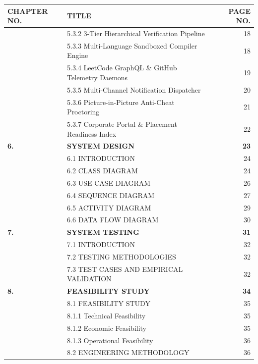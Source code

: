 \begin{table}[H]
  \centering
  \fontsize{12.5pt}{17.5pt}\selectfont
  \begin{tabularx}{\textwidth}{@{}p{3.2cm} L r@{}}
    \textbf{CHAPTER NO.} & \textbf{TITLE} & \textbf{PAGE NO.} \\
    \midrule
     & 5.3.2 3-Tier Hierarchical Verification Pipeline & 18 \\
     & 5.3.3 Multi-Language Sandboxed Compiler Engine & 18 \\
     & 5.3.4 LeetCode GraphQL \& GitHub Telemetry Daemons & 19 \\
     & 5.3.5 Multi-Channel Notification Dispatcher & 20 \\
     & 5.3.6 Picture-in-Picture Anti-Cheat Proctoring & 21 \\
     & 5.3.7 Corporate Portal \& Placement Readiness Index & 22 \\
    \textbf{6.} & \textbf{SYSTEM DESIGN} & \textbf{23} \\
     & 6.1 INTRODUCTION & 24 \\
     & 6.2 CLASS DIAGRAM & 24 \\
     & 6.3 USE CASE DIAGRAM & 26 \\
     & 6.4 SEQUENCE DIAGRAM & 27 \\
     & 6.5 ACTIVITY DIAGRAM & 29 \\
     & 6.6 DATA FLOW DIAGRAM & 30 \\
    \textbf{7.} & \textbf{SYSTEM TESTING} & \textbf{31} \\
     & 7.1 INTRODUCTION & 32 \\
     & 7.2 TESTING METHODOLOGIES & 32 \\
     & 7.3 TEST CASES AND EMPIRICAL VALIDATION & 32 \\
    \textbf{8.} & \textbf{FEASIBILITY STUDY} & \textbf{34} \\
     & 8.1 FEASIBILITY STUDY & 35 \\
     & 8.1.1 Technical Feasibility & 35 \\
     & 8.1.2 Economic Feasibility & 35 \\
     & 8.1.3 Operational Feasibility & 36 \\
     & 8.2 ENGINEERING METHODOLOGY & 36 \\
    \bottomrule
  \end{tabularx}
\end{table}
\newpage

